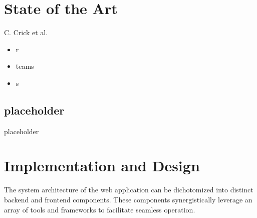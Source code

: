 \documentclass[conference]{IEEEtran}
\begin{document}
\section{State of the Art}
C. Crick et al.  
\begin{itemize}
\item r
\item teams
\item s
\end{itemize}

\subsection{placeholder}
placeholder

\section{Implementation and Design}
The system architecture of the web application can be dichotomized into distinct backend and frontend components. These components synergistically leverage an array of tools and frameworks to facilitate seamless operation.
\end{document}

